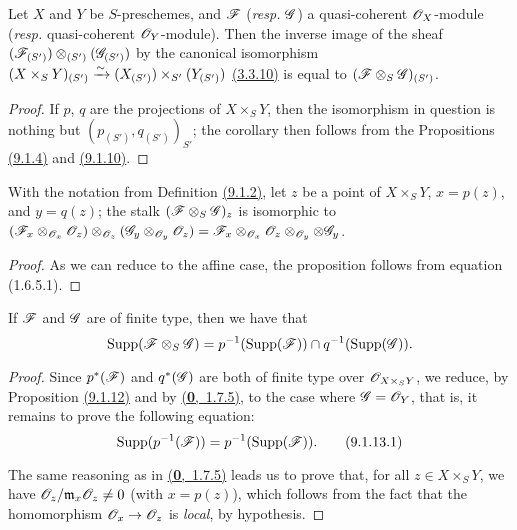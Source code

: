 \begin{cor}[9.1.11]
\label{cor-1.9.1.11}
Let $X$ and $Y$ be $S$-preschemes, and
$\mathscr{F}$ ({\it resp.} $\mathscr{G}$) a quasi-coherent $\mathscr{O}_X$-module
({\it resp.} quasi-coherent $\mathscr{O}_Y$-module). Then the inverse image of the sheaf
$(\mathscr{F}_{(S')})\otimes_{(S')}(\mathscr{G}_{(S')})$ by the canonical isomorphism
$(X\times_S Y)_{(S')}\xrightarrow{\sim}(X_{(S')})\times_{S'}(Y_{(S')})$
\hyperref[cor-1.3.3.10]{(3.3.10)} is equal to $(\mathscr{F}\otimes_S\mathscr{G})_{(S')}$.
\end{cor}

\begin{proof}
\label{proof-cor-1.9.1.11}
If $p$, $q$ are the projections of $X\times_S Y$, then the isomorphism in question
is nothing but $(p_{(S')}, q_{(S')})_{S'}$; the corollary then follows from the
Propositions \hyperref[prop-1.9.1.4]{(9.1.4)} and \hyperref[prop-1.9.1.10]{(9.1.10)}.
\end{proof}

\begin{prop}[9.1.12]
\label{prop-1.9.1.12}
With the notation from Definition \hyperref[defn-1.9.1.2]{(9.1.2)}, let $z$ be
a point of $X\times_S Y$, $x=p(z)$, and $y=q(z)$; the stalk
$(\mathscr{F}\otimes_S\mathscr{G})_z$ is isomorphic to
$(\mathscr{F}_x\otimes_{\mathscr{O}_x}\mathscr{O}_z)\otimes_{\mathscr{O}_z}(\mathscr{G}_y\otimes_{\mathscr{O}_y}\mathscr{O}_z)
  =\mathscr{F}_x\otimes_{\mathscr{O}_x}\mathscr{O}_z\otimes_{\mathscr{O}_y}\otimes\mathscr{G}_y$.
\end{prop}

\begin{proof}
\label{proof-prop-1.9.1.12}
As we can reduce to the affine case, the proposition follows from
equation (1.6.5.1).
\end{proof}

\begin{cor}[9.1.13]
\label{cor-1.9.1.13}
If $\mathscr{F}$ and $\mathscr{G}$ are of finite type, then we have that
\[
  {\mathop{\mathrm{Supp}}\nolimits}(\mathscr{F}\otimes_S\mathscr{G})=p^{-1}({\mathop{\mathrm{Supp}}\nolimits}(\mathscr{F}))\cap q^{-1}({\mathop{\mathrm{Supp}}\nolimits}(\mathscr{G})).
\]
\end{cor}

\begin{proof}
\label{proof-cor-1.9.1.13}
Since $p^*(\mathscr{F})$ and $q^*(\mathscr{G})$ are both of finite type over
$\mathscr{O}_{X\times_S Y}$, we reduce, by Proposition \hyperref[prop-1.9.1.12]{(9.1.12)} and by \hyperref[env-0.1.7.5]{(\textbf{0},~1.7.5)}, to
the case where $\mathscr{G}=\mathscr{O}_Y$, that is, it remains to prove the following
equation:
\[
  {\mathop{\mathrm{Supp}}\nolimits}(p^{-1}(\mathscr{F}))=p^{-1}({\mathop{\mathrm{Supp}}\nolimits}(\mathscr{F})).
  \tag{9.1.13.1}
\]

The same reasoning as in \hyperref[env-0.1.7.5]{(\textbf{0},~1.7.5)} leads us to prove that, for all
$z\in X\times_S Y$, we have $\mathscr{O}_z/\mathfrak{m}_x\mathscr{O}_z\neq0$ (with $x=p(z)$),
which follows from the fact that the homomorphism $\mathscr{O}_x\to\mathscr{O}_z$ is {\it local},
by hypothesis.
\end{proof}

